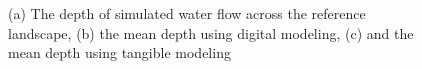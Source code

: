 \documentclass{isprs}
\begin{document}
\begin{figure}
\begin{center}
\caption{(a) The depth of simulated water flow across the reference landscape, (b) the mean depth using digital modeling, (c) and the mean depth using tangible modeling}
\label{fig:mean_depth}
\end{center}
\end{figure}
%
%
%
\end{document}
